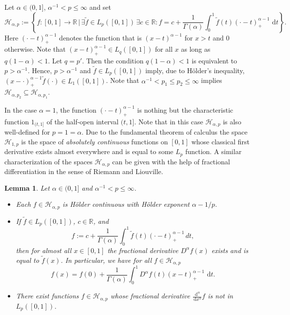 \documentclass[12pt]{article}
\newtheorem{lemma}{Lemma}
\newcommand{\rd}{\,\mathrm{d}}
\newcommand{\RR}{\mathbb{R}}
\newcommand{\real}{\mathbb{R}}
\newcommand{\HH}{\mathcal{H}}
\begin{document}
Let $\alpha \in (0,1]$, $ \alpha^{-1} < p \le \infty$ and set
\begin{equation}\label{def_frac_H_alpha_p}
\HH_{\alpha,p} := \left\{f:[0,1]\rightarrow \real
\, \bigg|\,  \exists \tilde{f} \in
L_p([0,1])\, \exists c \in \real: f = c + \frac{1}{\Gamma(\alpha)}
\int_0^1 \tilde{f}(t) (\cdot-t)_+^{\alpha-1} \,\rd t \right\}.
\end{equation}
Here $(\cdot-t)_+^{\alpha-1}$ denotes the function that is
$(x-t)^{\alpha-1}$ for $x>t$ and $0$ otherwise.
Note that $(x-t)_+^{\alpha-1} \in L_q([0,1])$ for all $x$ as long as
$q(1-\alpha) < 1$.
Let $q = p'$.
Then the condition $q(1-\alpha)<1$ is equivalent to $p> \alpha^{-1}$.
Hence, $p>\alpha^{-1}$ and $\tilde{f} \in L_p([0,1])$ imply, due to H\"older's inequality,
$(x-\cdot)_+^{\alpha-1} \tilde{f}(\cdot) \in L_1([0,1])$.
Note that $\alpha^{-1} < p_1 \le p_2 \le \infty$ implies $\HH_{\alpha,p_2} \subseteq \HH_{\alpha,p_1}$.

In the case $\alpha = 1$, the function $(\cdot-t)_+^{\alpha-1}$ is 
nothing but the characteristic function $1_{(t,1]}$ of the half-open
interval $(t,1]$. 
Note that in this case  $\mathcal{H}_{\alpha,p}$ is also well-defined for $p=1=\alpha$.
Due to the fundamental theorem of calculus the space $\HH_{1,p}$ is the space of
\emph{absolutely continuous} functions on $[0,1]$ whose classical first derivative exists almost everywhere and is equal to some $L_p$ function.
A similar characterization of the spaces $\HH_{\alpha,p}$ can be 
given with the help of fractional differentiation in the sense of 
Riemann and Liouville.


\begin{lemma}\label{Lemma0}
Let $\alpha \in (0,1]$ and $\alpha^{-1} < p \le \infty$.
\begin{itemize}
\item[{\rm(}i\rm{)}] Each $f\in \HH_{\alpha,p}$ is
H\"older continuous with H\"older exponent $\alpha -1/p$.
\item[{\rm(}ii\rm{)}]
If $\tilde{f}\in L_p([0,1])$, $c\in\RR$, and
\begin{equation}
\label{rep}
f := c + \frac{1}{\Gamma(\alpha)} \int^1_0 \tilde{f}(t)
(\cdot - t)_+^{\alpha -1}\,dt,
\end{equation}
then for almost all $x\in [0,1]$ the fractional
derivative $D^{\alpha}f(x)$ exists
and is equal to $\tilde{f}(x)$. In particular, we have for all
$f\in\HH_{\alpha,p}$
\begin{equation}\label{eq_taylor}
f(x) = f(0) + \frac{1}{\Gamma(\alpha)} \int_0^1 D^\alpha f(t)
(x-t)_+^{\alpha-1} \,\rd t.
\end{equation}
\item[{\rm(}iii\rm{)}] There exist functions $f\in\HH_{\alpha,p}$ whose
fractional derivative $\frac{\rd^\alpha}{\rd x^\alpha} f$ is not
in $L_p([0,1])$.
\end{itemize}
\end{lemma}
\end{document}
